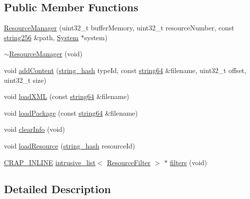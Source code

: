 \subsection*{Public Member Functions}
\begin{DoxyCompactItemize}
\item 
\hyperlink{classcrap_1_1_resource_manager_a2cda1eaa9c69060848b4c61afb69e5cf}{Resource\+Manager} (uint32\+\_\+t buffer\+Memory, uint32\+\_\+t resource\+Number, const \hyperlink{namespacecrap_af674ac1cc38a09c563c68dfc3b15e554}{string256} \&path, \hyperlink{classcrap_1_1_system}{System} $\ast$system)
\item 
\hyperlink{classcrap_1_1_resource_manager_a3767e6beaffac75e340a728fab19ce34}{$\sim$\+Resource\+Manager} (void)
\item 
void \hyperlink{classcrap_1_1_resource_manager_a8c3abdfffc6f71cf80cb279ea10c5952}{add\+Content} (\hyperlink{classcrap_1_1string__hash}{string\+\_\+hash} type\+Id, const \hyperlink{namespacecrap_a2b8a7358804e1a9c3c32f12d8cdcfdf8}{string64} \&filename, uint32\+\_\+t offset, uint32\+\_\+t size)
\item 
void \hyperlink{classcrap_1_1_resource_manager_adcb82db8e4c9649c7a2ebb7f2e3f2e32}{load\+X\+M\+L} (const \hyperlink{namespacecrap_a2b8a7358804e1a9c3c32f12d8cdcfdf8}{string64} \&filename)
\item 
void \hyperlink{classcrap_1_1_resource_manager_af0f9337b147ff6adaf4378e4258bb968}{load\+Package} (const \hyperlink{namespacecrap_a2b8a7358804e1a9c3c32f12d8cdcfdf8}{string64} \&filename)
\item 
void \hyperlink{classcrap_1_1_resource_manager_ae2ce27f2b184d7700e9442f84f514dbc}{clear\+Info} (void)
\item 
void \hyperlink{classcrap_1_1_resource_manager_ac5c476360ad625aa3ef9f12e0de67140}{load\+Resource} (\hyperlink{classcrap_1_1string__hash}{string\+\_\+hash} resource\+Id)
\item 
\hyperlink{config__x86_8h_a5a40526b8d842e7ff731509998bb0f1c}{C\+R\+A\+P\+\_\+\+I\+N\+L\+I\+N\+E} \hyperlink{classcrap_1_1intrusive__list}{intrusive\+\_\+list}$<$ \hyperlink{classcrap_1_1_resource_filter}{Resource\+Filter} $>$ $\ast$ \hyperlink{classcrap_1_1_resource_manager_a26ba997dd0f6e688ce154e63b6e33e57}{filters} (void)
\end{DoxyCompactItemize}


\subsection{Detailed Description}


